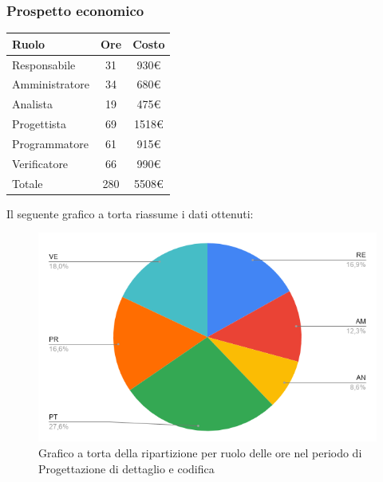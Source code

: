 {{{{{{{{{{{{{{		\subsubsection{Prospetto economico}\label{PreventivoFaseDiProgettazioneDiDettaglioECodificaProspettoEconomicoPeriodo3}
		\quad
		\def\tabularxcolumn#1{m{#1}}
		{
			\begin{center}
				\renewcommand{\arraystretch}{1.4}
				\begin{tabularx}{7cm}{|X|c|c|}
					\hline
					\rowcolor{airforceblue}
					\textbf{Ruolo} & \textbf{Ore} & \textbf{Costo}\\
					\hline
					Responsabile & 31 & 930\euro\\
					\hline
					Amministratore & 34 & 680\euro\\
					\hline
					Analista & 19 & 475\euro\\
					\hline
					Progettista & 69 & 1518\euro\\
					\hline
					Programmatore & 61 & 915\euro\\
					\hline
					Verificatore & 66 & 990\euro\\
					\hline
					Totale & 280 & 5508\euro\\
					\hline
				\end{tabularx}
			\end{center}
			
			Il seguente grafico a torta riassume i dati ottenuti:
			\begin{figure}[!ht]
				\begin{center}
					\includegraphics[width=0.8\linewidth]{../immagini/pdp/torta_progettazione_dettaglio.png}
					\caption{Grafico a torta della ripartizione per ruolo delle ore nel periodo di Progettazione
						di dettaglio e codifica}
				\end{center}
			\end{figure}
		
}}}}}}}}}}}}}}}
